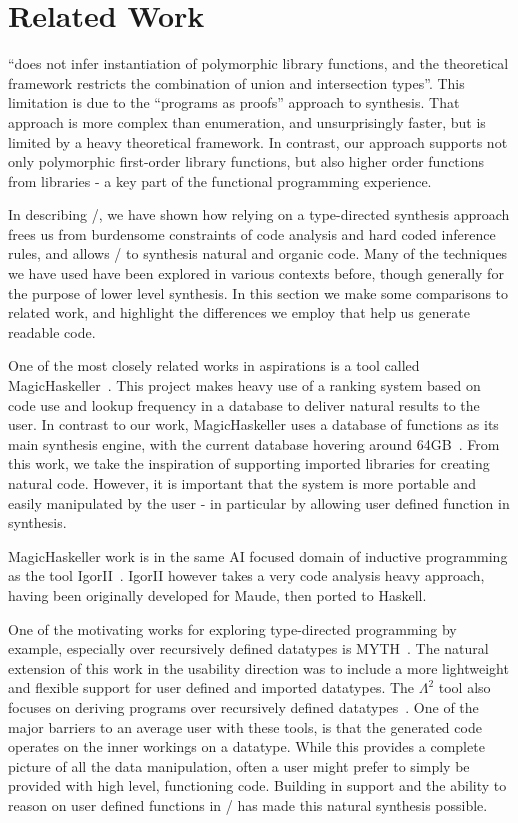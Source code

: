 \section{Related Work}
\label{sec:related}

\cite{Osera:2016} ``does not infer instantiation of polymorphic library functions, and the theoretical framework restricts the combination of union and intersection types''.
This limitation is due to the ``programs as proofs'' approach to synthesis.
That approach is more complex than enumeration, and unsurprisingly faster, but is limited by a heavy theoretical framework.
In contrast, our approach supports not only polymorphic first-order library functions, but also higher order functions from libraries - a key part of the functional programming experience. 

In describing \ourTool/, we have shown how relying on a type-directed synthesis approach frees us from burdensome constraints of code analysis and hard coded inference rules, and allows \ourTool/ to synthesis natural and organic code. Many of the techniques we have used have been explored in various contexts before, though generally for the purpose of lower level synthesis. In this section we make some comparisons to related work, and highlight the differences we employ that help us generate readable code.

One of the most closely related works in aspirations is a tool called MagicHaskeller~\cite{DBLP:conf/aaip/Katayama09}. This project makes heavy use of a ranking system based on code use and lookup frequency in a database to deliver natural results to the user. In contrast to our work, MagicHaskeller uses a database of functions as its main synthesis engine, with the current database hovering around
64GB~\cite{DBLP:conf/agi/Katayama15}. From this work, we take the inspiration of supporting imported libraries for creating natural code. However, it is important that the system is more portable and easily manipulated by the user - in particular by allowing user defined function in synthesis.

MagicHaskeller work is in the same AI focused domain of inductive programming as the tool IgorII~\cite{DBLP:conf/aaip/HofmannKS09}. IgorII however takes a very code analysis heavy approach, having been originally developed for Maude, then ported to Haskell.

One of the motivating works for exploring type-directed programming by example, especially over recursively defined datatypes is MYTH~\cite{Osera:2015, Osera:2016}. The natural extension of this work in the usability direction was to include a more lightweight and flexible support for user defined and imported datatypes. The $\Lambda^2$ tool also focuses on deriving programs over recursively defined datatypes~\cite{Feser:2015}. One of the major barriers to an average user with these tools, is that the generated code operates on the inner workings on a datatype. While this provides a complete picture of all the data manipulation, often a user might prefer to simply be provided with high level, functioning code. Building in support and the ability to reason on user defined functions in \ourTool/ has made this natural synthesis possible.

